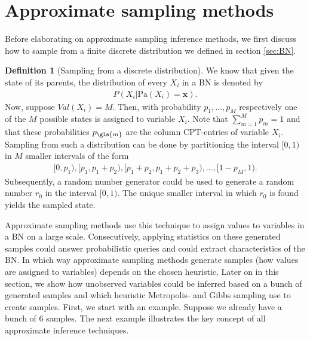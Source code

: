 \documentclass[a4paper, twoside, 11pt]{report}
\newcommand{\bfx}{{\mathbf{x}}}
\theoremstyle{plain}
\theoremstyle{definition}
\newtheorem{definition}[thm]{Definition}
\theoremstyle{remark}
\begin{document}



\section{Approximate sampling methods}\label{sec:approx-inf}
Before elaborating on approximate sampling inference methods, we first discuss how to sample from a finite discrete distribution we defined in section \ref{sec:BN}.
\begin{definition}[Sampling from a discrete distribution]\label{def:sampling}
We know that given the state of its parents, the distribution of every $X_i$ in a BN is denoted by 
\begin{align*}
P(X_i | \text{Pa}(X_i) = \bfx ).
\end{align*}
Now, suppose $Val(X_i) = M$. Then, with probability $p_1, \ldots, p_M$ respectively one of the $M$ possible states is assigned to variable $X_i$. Note that $\sum_{m=1}^M p_m = 1$ and that these probabilities $p_{\gls{m}}$ are the column CPT-entries of variable $X_i$. Sampling from such a distribution can be done by partitioning the interval $[0,1)$ in $M$  smaller intervals of the form
\begin{align*}
[0, p_1), [p_1, p_1 + p_2), [p_1 + p_2, p_1 + p_2 + p_3), \ldots , [1-p_M, 1).
\end{align*}
Subsequently, a random number generator could be used to generate a random number $r_0$ in the interval $[0,1)$. The unique smaller interval in which $r_0$ is found yields the sampled state.
\end{definition}
Approximate sampling methods use this technique to assign values to variables in a BN on a large scale. Consecutively, applying statistics on these generated samples could answer probabilistic queries and could extract characteristics of the BN. In which way approximate sampling methods generate samples (how values are assigned to variables) depends on the chosen heuristic. Later on in this section, we show how unobserved variables could be inferred based on a bunch of generated samples and which heuristic Metropolis- and Gibbs sampling use to create samples. First, we start with an example. Suppose we already have a bunch of $6$ samples. The next example illustrates the key concept of all approximate inference techniques.
\end{document}
